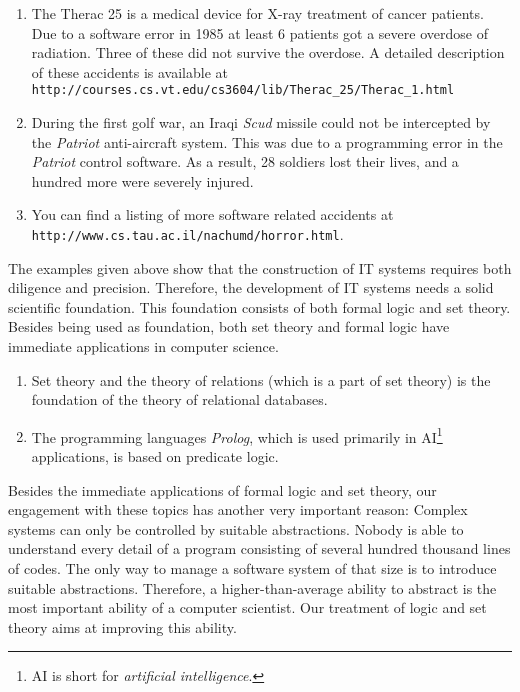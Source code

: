 \begin{enumerate}
\begin{itemize}
      \end{itemize}
\item The Therac 25 is a medical device for X-ray treatment of cancer patients.
      Due to a software error in 1985 at least 6 patients got a severe overdose of radiation.
      Three of these did not survive the overdose.
      A detailed description of these accidents is available at \\[0.1cm]
      \hspace*{1.3cm} \texttt{http://courses.cs.vt.edu/cs3604/lib/Therac\_25/Therac\_1.html}      
\item During the first golf war, an Iraqi  \textsl{Scud} missile could not be intercepted
      by the  \textsl{Patriot} anti-aircraft system.  This was due to a programming error
      in the \textsl{Patriot} control software.
      As a result, 28 soldiers lost their lives, and a hundred more were severely injured.
\item You can find a listing of more software related accidents at \\[0.1cm]
      \hspace*{1.3cm} \texttt{http://www.cs.tau.ac.il/nachumd/horror.html}.
\end{enumerate}
The examples given above show that the construction of IT systems requires both diligence
and precision.  Therefore, the development of IT systems needs a solid scientific foundation.
This foundation consists of both formal logic and set theory.
Besides being used as foundation, both set theory and formal logic have immediate
applications in computer science. 
\begin{enumerate}
\item Set theory and the theory of relations (which is a part of set theory)
      is the foundation of the theory of relational databases.
\item The programming languages \textsl{Prolog}, which is used primarily in 
      AI\footnote{AI is short for \emph{artificial intelligence}.} applications,
      is based on predicate logic.
\end{enumerate}
Besides the immediate applications of formal logic and set theory, our engagement with these topics
has another very important reason:  Complex systems can only be controlled by suitable abstractions.
Nobody is able to understand every detail of a program consisting of several hundred thousand lines
of codes.  The only way to manage a software system of that size is to introduce suitable
abstractions.  Therefore, a higher-than-average ability to abstract is the most important ability of
a computer scientist.  Our treatment of logic and set theory aims at improving this ability.

